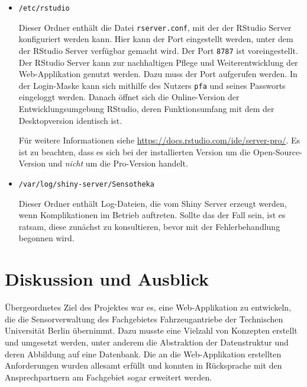 \documentclass[
]{article}
\begin{document}
\begin{itemize}
\item
  \texttt{/etc/rstudio}

  Dieser Ordner enthält die Datei \texttt{rserver.conf}, mit der der RStudio Server konfiguriert werden kann. Hier kann der Port eingestellt werden, unter dem der RStudio Server verfügbar gemacht wird. Der Port \texttt{8787} ist voreingestellt. Der RStudio Server kann zur nachhaltigen Pflege und Weiterentwicklung der Web-Applikation genutzt werden. Dazu muss der Port aufgerufen werden. In der Login-Maske kann sich mithilfe des Nutzers \texttt{pfa} und seines Passworts eingeloggt werden. Danach öffnet sich die Online-Version der Entwicklungsumgebung RStudio, deren Funktionsumfang mit dem der Desktopversion identisch ist.

  Für weitere Informationen siehe \url{https://docs.rstudio.com/ide/server-pro/}. Es ist zu beachten, dass es sich bei der installierten Version um die Open-Source-Version und \emph{nicht} um die Pro-Version handelt.
\end{itemize}

\begin{itemize}
\item
  \texttt{/var/log/shiny-server/Sensotheka}

  Dieser Ordner enthält Log-Dateien, die vom Shiny Server erzeugt werden, wenn Komplikationen im Betrieb auftreten. Sollte das der Fall sein, ist es ratsam, diese zunächst zu konsultieren, bevor mit der Fehlerbehandlung begonnen wird.
\end{itemize}

\hypertarget{discussion}{%
\section{Diskussion und Ausblick}\label{discussion}}

Übergeordnetes Ziel des Projektes war es, eine Web-Applikation zu entwickeln, die die Sensorverwaltung des Fachgebietes Fahrzeugantriebe der Technischen Universität Berlin übernimmt. Dazu musste eine Vielzahl von Konzepten erstellt und umgesetzt werden, unter anderem die Abstraktion der Datenstruktur und deren Abbildung auf eine Datenbank. Die an die Web-Applikation erstellten Anforderungen wurden allesamt erfüllt und konnten in Rücksprache mit den Ansprechpartnern am Fachgebiet sogar erweitert werden.
\end{document}
